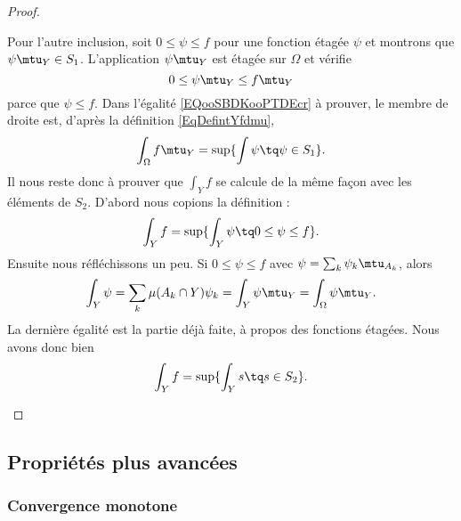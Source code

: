 \begin{proof}
\begin{subproof}
		Pour l'autre inclusion, soit \( 0\leq \psi\leq f\) pour une fonction étagée \( \psi\) et montrons que \( \psi\mtu_Y\in S_1\). L'application \( \psi\mtu_Y\) est étagée sur \( \Omega\) et vérifie
		\begin{equation}
			0\leq \psi\mtu_Y\leq f\mtu_Y
		\end{equation}
		parce que \( \psi\leq f\).
		Dans l'égalité \ref{EQooSBDKooPTDEcr} à prouver, le membre de droite est, d'après la définition \ref{EqDefintYfdmu},
		\begin{equation}
			\int_{\Omega}f\mtu_Y=\sup\{ \int\psi\tq \psi\in S_1 \}.
		\end{equation}
		Il nous reste donc à prouver que \(  \int_Yf\) se calcule de la même façon avec les éléments de \( S_2\). D'abord nous copions la définition :
		\begin{equation}
			\int_Yf=\sup\{ \int_Y\psi\tq 0\leq \psi\leq f \}.
		\end{equation}
		Ensuite nous réfléchissons un peu. Si \( 0\leq \psi\leq f\) avec \( \psi=\sum_k\psi_k\mtu_{A_k}\), alors
		\begin{equation}
			\int_Y\psi=\sum_k\mu(A_k\cap Y)\psi_k=\int_Y\psi\mtu_{Y}=\int_{\Omega}\psi\mtu_Y.
		\end{equation}
		La dernière égalité est la partie déjà faite, à propos des fonctions étagées. Nous avons donc bien
		\begin{equation}
			\int_Yf=\sup\{ \int_Ys\tq s\in S_2 \}.
		\end{equation}
	\end{subproof}
\end{proof}

\subsection{Propriétés plus avancées}

\subsubsection{Convergence monotone}

